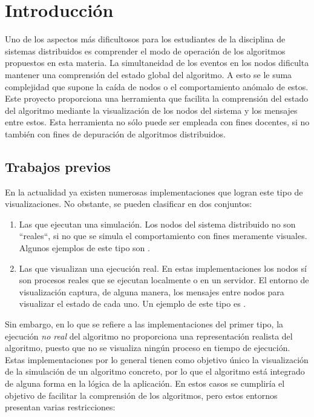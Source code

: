 \chapter{Introducción}
\label{ch:intro}

Uno de los aspectos más dificultosos para los estudiantes de la disciplina de sistemas distribuidos es comprender el modo de operación de los algoritmos propuestos en esta materia. La simultaneidad de los eventos en los nodos dificulta mantener una comprensión del estado global del algoritmo. A esto se le suma complejidad que supone la caída de nodos o el comportamiento anómalo de estos. Este proyecto proporciona una herramienta que facilita la comprensión del estado del algoritmo mediante la visualización de los nodos del sistema y los mensajes entre estos. Esta herramienta no sólo puede ser empleada con fines docentes, si no también con fines de depuración de algoritmos distribuidos.

\section{Trabajos previos}

En la actualidad ya existen numerosas implementaciones que logran este tipo de visualizaciones. No obstante, se pueden clasificar en dos conjuntos:

\begin{enumerate}
\item Las que ejecutan una simulación. Los nodos del sistema distribuido no son ``reales``, si no que se simula el comportamiento con fines meramente visuales. Algunos ejemplos de este tipo son \cite{raft1}\cite{raft2}\cite{raft3}.
\item Las que visualizan una ejecución real. En estas implementaciones los nodos sí son procesos reales que se ejecutan localmente o en un servidor. El entorno de visualización captura, de alguna manera, los mensajes entre nodos para visualizar el estado de cada uno. Un ejemplo de este tipo es \cite{MOSES200497}.
\end{enumerate}

Sin embargo, en lo que se refiere a las implementaciones del primer tipo, la ejecución \textit{no real} del algoritmo no proporciona una representación realista del algoritmo, puesto que no se visualiza ningún proceso en tiempo de ejecución. Estas implementaciones por lo general tienen como objetivo único la visualización de la simulación de un algoritmo concreto, por lo que el algoritmo está integrado de alguna forma en la lógica de la aplicación. En estos casos se cumpliría el objetivo de facilitar la comprensión de los algoritmos, pero estos entornos presentan varias restricciones:

